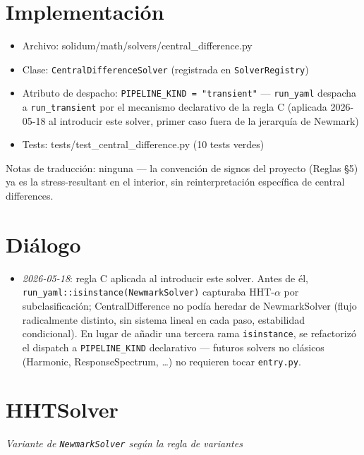 \documentclass[11pt,letterpaper,oneside]{report}
\begin{document}
\section{Implementación}

\begin{itemize}
  \item Archivo: solidum/math/solvers/central\_difference.py
  \item Clase: \texttt{CentralDifferenceSolver} (registrada en \texttt{SolverRegistry})
  \item Atributo de despacho: \texttt{PIPELINE\_KIND = "transient"} --- \texttt{run\_yaml} despacha a \texttt{run\_transient} por el mecanismo declarativo de la regla C (aplicada 2026-05-18 al introducir este solver, primer caso fuera de la jerarquía de Newmark)
  \item Tests: tests/test\_central\_difference.py (10 tests verdes)
\end{itemize}

Notas de traducción: ninguna --- la convención de signos del proyecto (Reglas §5) ya es la stress-resultant en el interior, sin reinterpretación específica de central differences.


\section{Diálogo}

\begin{itemize}
  \item \textit{2026-05-18}: regla C aplicada al introducir este solver. Antes de él, \texttt{run\_yaml::isinstance(NewmarkSolver)} capturaba HHT-\ensuremath{\alpha} por subclasificación; CentralDifference no podía heredar de NewmarkSolver (flujo radicalmente distinto, sin sistema lineal en cada paso, estabilidad condicional). En lugar de añadir una tercera rama \texttt{isinstance}, se refactorizó el dispatch a \texttt{PIPELINE\_KIND} declarativo --- futuros solvers no clásicos (Harmonic, ResponseSpectrum, \ldots{}) no requieren tocar \texttt{entry.py}.
\end{itemize}


\newpage

\section{HHTSolver}



\textit{Variante de \texttt{NewmarkSolver} según la regla de variantes}
\end{document}

